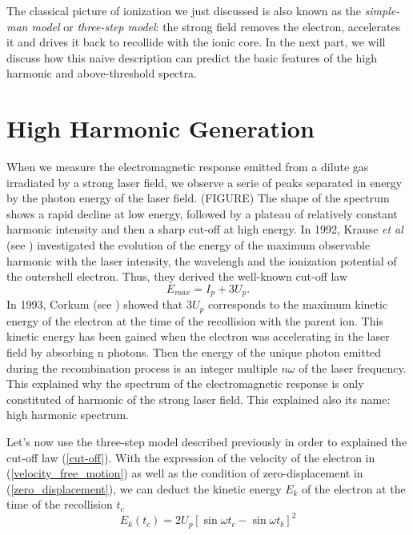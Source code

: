 \documentclass[a4paper]{article}
\begin{document}
The classical picture of ionization we just discussed is also known as the \textit{simple-man model} or \textit{three-step model}:
the strong field removes the electron, accelerates it and drives it back to recollide with the ionic core.
In the next part, we will discuss how this naive description can predict the basic features of the high harmonic and above-threshold spectra.

\section{High Harmonic Generation}

When we measure the electromagnetic response emitted from a dilute gas irradiated by a strong laser field, we observe a serie of peaks separated in energy by the photon energy of the laser field. (FIGURE) The shape of the spectrum shows a rapid decline at low energy, followed by a plateau of relatively constant harmonic intensity and then a sharp cut-off at high energy.
In 1992, Krause \textit{et al} (see \cite{Krause_1992}) investigated the evolution of the energy of the maximum observable harmonic with the laser intensity, the wavelengh and the ionization potential of the outershell electron. Thus, they derived the well-known cut-off law
\begin{equation}
\label{cut-off}
E_{max}=I_{p}+3U_{p}.
\end{equation}
In 1993, Corkum (see \cite{Corkum_1993}) showed that $3U_{p}$ corresponds to the maximum kinetic energy of the electron at the time of the recollision with the parent ion. This kinetic energy has been gained when the electron was accelerating in the laser field by absorbing n photons. Then the energy of the unique photon emitted during the recombination process is an integer multiple $n\omega$ of the laser frequency. This explained why the spectrum of the electromagnetic response is only constituted of harmonic of the strong laser field. This explained also its name: high harmonic spectrum.
\par 
Let's now use the three-step model described previously in order to explained the cut-off law (\ref{cut-off}).
With the expression of the velocity of the electron in (\ref{velocity_free_motion}) as well as the condition of zero-displacement in (\ref{zero_displacement}), we can deduct the kinetic energy $E_{k}$ of the electron at the time of the recollision $t_{c}$
\begin{equation}
E_{k}(t_{c})=2U_{p}\left[ \sin{\omega t_{c}}-\sin{\omega t_{b}}\right ]^{2}
\end{equation}
\end{document}
